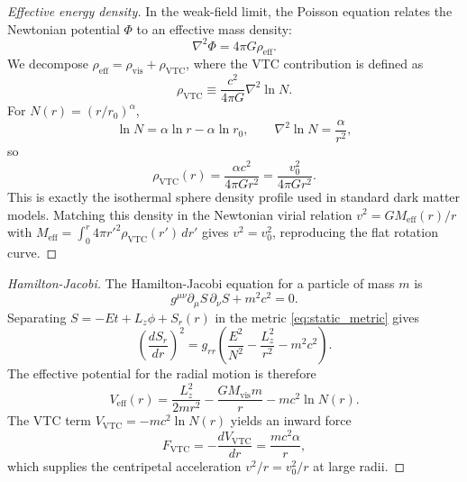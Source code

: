 \documentclass[11pt,a4paper]{article}
\theoremstyle{definition}
\newcommand{\vis}{\mathrm{vis}}
\newcommand{\eff}{\mathrm{eff}}
\newcommand{\VTC}{\mathrm{VTC}}
\begin{document}
\begin{proof}[Effective energy density]
In the weak-field limit, the Poisson equation relates the Newtonian potential $\Phi$ to an effective mass density:
\begin{equation}
    \nabla^2\Phi = 4\pi G \rho_{\eff}.
\end{equation}
We decompose $\rho_{\eff}=\rho_{\vis}+\rho_{\VTC}$, where the VTC contribution is defined as
\begin{equation}
    \rho_{\VTC} \equiv \frac{c^2}{4\pi G}\nabla^2\ln N.
\end{equation}
For $N(r)=(r/r_0)^\alpha$,
\begin{equation}
    \ln N = \alpha\ln r - \alpha\ln r_0,\qquad \nabla^2\ln N = \frac{\alpha}{r^2},
\end{equation}
so
\begin{equation}
    \boxed{\rho_{\VTC}(r) = \frac{\alpha c^2}{4\pi G r^2} = \frac{v_0^2}{4\pi G r^2}}.
\end{equation}
This is exactly the isothermal sphere density profile used in standard dark matter models. Matching this density in the Newtonian virial relation $v^2=GM_{\eff}(r)/r$ with $M_{\eff}=\int_0^r 4\pi r'^2 \rho_{\VTC}(r')\,dr'$ gives $v^2=v_0^2$, reproducing the flat rotation curve.
\end{proof}

\begin{proof}[Hamilton-Jacobi]
The Hamilton-Jacobi equation for a particle of mass $m$ is
\begin{equation}
    g^{\mu\nu}\partial_\mu S\,\partial_\nu S + m^2c^2 = 0.
\end{equation}
Separating $S=-Et+L_z\phi+S_r(r)$ in the metric \eqref{eq:static_metric} gives
\begin{equation}
    \left(\frac{dS_r}{dr}\right)^2 = g_{rr}\left(\frac{E^2}{N^2} - \frac{L_z^2}{r^2} - m^2c^2\right).
\end{equation}
The effective potential for the radial motion is therefore
\begin{equation}
    V_{\eff}(r) = \frac{L_z^2}{2mr^2} - \frac{GM_{\vis}m}{r} - mc^2\ln N(r).
\end{equation}
The VTC term $V_{\VTC}=-mc^2\ln N(r)$ yields an inward force
\begin{equation}
    F_{\VTC} = -\frac{dV_{\VTC}}{dr} = \frac{mc^2\alpha}{r},
\end{equation}
which supplies the centripetal acceleration $v^2/r=v_0^2/r$ at large radii.
\end{proof}
\end{document}
